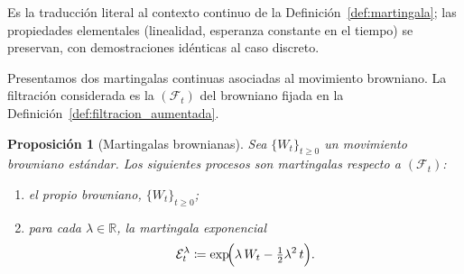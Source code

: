 \documentclass[11pt,a4paper,oneside]{report}
\theoremstyle{plain}
\newtheorem{proposicion}[teorema]{Proposición}
\theoremstyle{definition}
\theoremstyle{remark}
\newcommand{\R}{\mathbb{R}}
\newcommand{\F}{\mathcal{F}}
\newcommand{\1}{\mathbf{1}}
\newcommand{\eqdef}{\coloneqq}
\begin{document}
Es la traducción literal al contexto continuo de la
Definición~\ref{def:martingala}; las propiedades elementales
(linealidad, esperanza constante en el tiempo) se preservan, con
demostraciones idénticas al caso discreto.

Presentamos dos martingalas
continuas asociadas al movimiento browniano. La filtración
considerada es la $(\F_t)$ del browniano fijada en la
Definición~\ref{def:filtracion_aumentada}.

\begin{proposicion}[Martingalas brownianas]
\label{prop:martingalas_brownianas}
Sea $\{W_t\}_{t \geq 0}$ un movimiento browniano estándar. Los
siguientes procesos son martingalas respecto a $(\F_t)$:
\begin{enumerate}[label=\textnormal{(\alph*)}]
  \item el propio browniano, $\{W_t\}_{t \geq 0}$;
  \item para cada $\lambda \in \R$, la \emph{martingala exponencial}
        \begin{equation}\label{eq:martingala_exponencial}
          \mathcal{E}_t^{\lambda} \eqdef
          \exp\!\Bigl(\lambda\, W_t - \tfrac{1}{2}\lambda^2\, t\Bigr).
        \end{equation}
\end{enumerate}
\end{proposicion}
\end{document}
